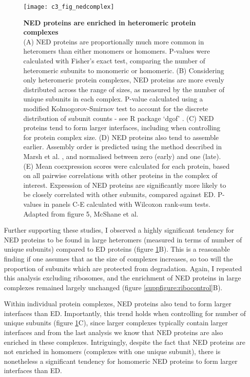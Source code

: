 \documentclass[a4paper,11pt,twoside,openright]{scrbook}
\begin{document}
\begin{figure}
    \texttt{[image: c3\_fig\_nedcomplex]}
    \caption[NED proteins are enriched in heteromeric protein complexes]{\sffamily \textbf{NED proteins are enriched in heteromeric protein complexes} \\ \small (A) NED proteins are proportionally much more common in heteromers than either monomers or homomers. P-values were calculated with Fisher's exact test, comparing the number of heteromeric subunits to monomeric or homomeric. (B) Considering only heteromeric protein complexes, NED proteins are more evenly distributed across the range of sizes, as measured by the number of unique subunits in each complex. P-value calculated using a modified Kolmogorov-Smirnov test to account for the discrete distribution of subunit counts - see R package `dgof' \cite{Arnold2011}. (C) NED proteins tend to form larger interfaces, including when controlling for protein complex size. (D) NED proteins also tend to assemble earlier. Assembly order is predicted using the method described in Marsh et al. \cite{Marsh2013}, and normalised between zero (early) and one (late). (E) Mean coexpression scores were calculated for each protein, based on all pairwise correlations with other proteins in the complex of interest. Expression of NED proteins are significantly more likely to be closely correlated with other subunits, compared against ED. P-values in panels C-E calculated with Wilcoxon rank-sum tests. Adapted from figure 5, McShane et al.\cite{McShane2016}}
    \label{figure:nedcomplex}
\end{figure}

Further supporting these studies, I observed a highly significant tendency for NED proteins to be found in large heteromers (measured in terms of number of unique subunits) compared to ED proteins (figure \ref{figure:nedcomplex}B). This is a reasonable finding if one assumes that as the size of complexes increases, so too will the proportion of subunits which are protected from degradation. Again, I repeated this analysis excluding ribosomes, and the enrichment of NED proteins in large complexes remained largely unchanged (figure \ref{suppfigure:ribocontrol}B).

Within individual protein complexes, NED proteins also tend to form larger interfaces than ED. Importantly, this trend holds when controlling for number of unique subunits (figure \ref{figure:nedcomplex}C), since larger complexes typically contain larger interfaces and from the last analysis we know that NED proteins are also enriched in these complexes. Intriguingly, despite the fact that NED proteins are not enriched in homomers (complexes with one unique subunit), there is nonetheless a significant tendency for homomeric NED proteins to form larger interfaces than ED.
\end{document}
